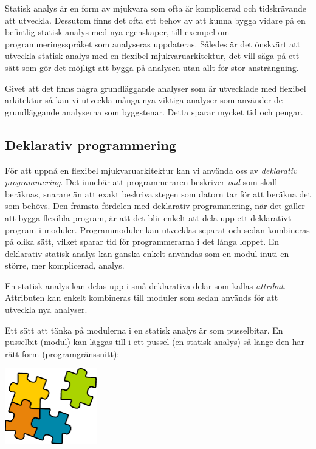 \documentclass[10pt, twoside, openright]{book}
\begin{document}
\vspace{1.5em}

Statisk analys är en form av mjukvara som ofta är komplicerad och tidskrävande att utveckla.
Dessutom finns det ofta ett behov av att kunna bygga vidare på en befintlig statisk analys med
nya egenskaper, till exempel om programmeringsspråket som analyseras uppdateras.
Således är det önskvärt att utveckla statisk analys med en flexibel mjukvaruarkitektur, det vill
säga på ett sätt som gör det möjligt att bygga på analysen utan allt för stor ansträngning.

Givet att det finns några grundläggande analyser som är utvecklade
med flexibel arkitektur så kan vi utveckla många nya viktiga analyser som använder de grundläggande
analyserna som byggstenar. Detta sparar mycket tid och pengar.

\subsection*{Deklarativ programmering}

För att uppnå en flexibel mjukvaruarkitektur kan vi använda oss av \emph{deklarativ programmering}.
Det innebär att programmeraren beskriver \emph{vad} som skall beräknas, snarare än
att exakt beskriva stegen som datorn tar för att beräkna det som behövs.
Den främsta fördelen med
deklarativ programmering, när det gäller att bygga flexibla program, är att det blir enkelt
att dela upp ett deklarativt program i moduler.
Programmoduler kan utvecklas separat och sedan kombineras på olika sätt, vilket sparar tid
för programmerarna i det långa loppet.
En deklarativ statisk analys kan ganska enkelt användas som en modul inuti en större, mer komplicerad,
analys.

En statisk analys kan delas upp i små deklarativa delar som kallas
\emph{attribut}. Attributen kan enkelt kombineras till moduler som sedan
används för att utveckla nya analyser.

Ett sätt att tänka på modulerna i en statisk analys är som pusselbitar. En pusselbit (modul)
kan läggas till i ett pussel (en statisk analys) så länge den har rätt form (programgränssnitt):

\begin{center}
\includegraphics[width=4cm]{figures/puzzle}
\end{center}
\end{document}
